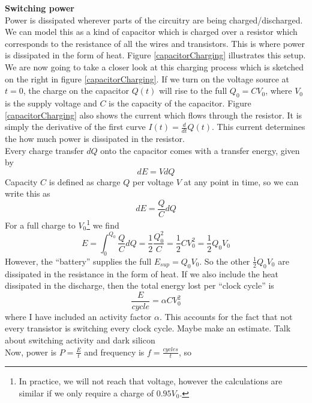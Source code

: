 \documentclass[12pt,a4paper]{article}
\newcommand{\note}{\textcolor{WildStrawberry}}
\begin{document}
\textbf{Switching power}\\
Power is dissipated wherever parts of the circuitry are being charged/discharged. We can model this as a kind of capacitor which is charged over a resistor which corresponds to the resistance of all the wires and transistors. This is where power is dissipated in the form of heat. Figure \ref{capacitorCharging} illustrates this setup.\\
We are now going to take a closer look at this charging process which is sketched on the right in figure \ref{capacitorCharging}. If we turn on the voltage source at $t=0$, the charge on the capacitor $Q(t)$ will rise to the full $Q_0 = CV_0$, where $V_0$ is the supply voltage and $C$ is the capacity of the capacitor. Figure \ref{capacitorCharging} also shows the current which flows through the resistor. It is simply the derivative of the first curve $I(t)= \frac{d}{dt}Q(t)$. This current determines the how much power is dissipated in the resistor.\\ Every charge transfer $dQ$ onto the capacitor comes with a transfer energy, given by
\begin{equation}
	dE = VdQ
\end{equation}
Capacity $C$ is defined as charge $Q$ per voltage $V$ at any point in time, so we can write this as
\begin{equation}
	dE = \frac{Q}{C} dQ
\end{equation}
For a full charge to $V_0$\footnote{In practice, we will not reach that voltage, however the calculations are similar if we only require a charge of $0.95V_0$.} we find
\begin{equation}
	E = \int_{0}^{Q_0} \frac{Q}{C} dQ = \frac{1}{2} \frac{Q_0^2}{C} = \frac{1}{2} C V_0^2 = \frac{1}{2} Q_0 V_0
\end{equation}
However, the ``battery'' supplies the full $E_{sup} = Q_0 V_0$. So the other $\frac{1}{2}Q_0 V_0$ are dissipated in the resistance in the form of heat. If we also include the heat dissipated in the discharge, then the total energy lost per ``clock cycle'' is
\begin{equation}
	\frac{E}{cycle} = \alpha C V_0^2
\end{equation}
where I have included an activity factor $\alpha$. This accounts for the fact that not every transistor is switching every clock cycle. \note{Maybe make an estimate. Talk about switching activity and dark silicon} \\ 
Now, power is $P=\frac{E}{t}$ and frequency is $f=\frac{cycles}{t}$, so
\end{document}
